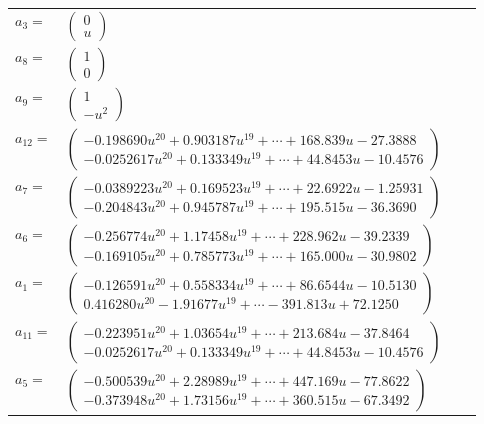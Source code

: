\documentclass[1p]{elsarticle_modified}
\theoremstyle{definition}
\begin{document}
\begin{tabular}{m{7pt} m{180pt} m{7pt} m{180pt} }
\flushright $a_{3}=$&$\begin{pmatrix}0\\u\end{pmatrix}$ \\
\flushright $a_{8}=$&$\begin{pmatrix}1\\0\end{pmatrix}$ \\
\flushright $a_{9}=$&$\begin{pmatrix}1\\- u^2\end{pmatrix}$ \\
\flushright $a_{12}=$&$\begin{pmatrix}-0.198690 u^{20}+0.903187 u^{19}+\cdots+168.839 u-27.3888\\-0.0252617 u^{20}+0.133349 u^{19}+\cdots+44.8453 u-10.4576\end{pmatrix}$ \\
\flushright $a_{7}=$&$\begin{pmatrix}-0.0389223 u^{20}+0.169523 u^{19}+\cdots+22.6922 u-1.25931\\-0.204843 u^{20}+0.945787 u^{19}+\cdots+195.515 u-36.3690\end{pmatrix}$ \\
\flushright $a_{6}=$&$\begin{pmatrix}-0.256774 u^{20}+1.17458 u^{19}+\cdots+228.962 u-39.2339\\-0.169105 u^{20}+0.785773 u^{19}+\cdots+165.000 u-30.9802\end{pmatrix}$ \\
\flushright $a_{1}=$&$\begin{pmatrix}-0.126591 u^{20}+0.558334 u^{19}+\cdots+86.6544 u-10.5130\\0.416280 u^{20}-1.91677 u^{19}+\cdots-391.813 u+72.1250\end{pmatrix}$ \\
\flushright $a_{11}=$&$\begin{pmatrix}-0.223951 u^{20}+1.03654 u^{19}+\cdots+213.684 u-37.8464\\-0.0252617 u^{20}+0.133349 u^{19}+\cdots+44.8453 u-10.4576\end{pmatrix}$ \\
\flushright $a_{5}=$&$\begin{pmatrix}-0.500539 u^{20}+2.28989 u^{19}+\cdots+447.169 u-77.8622\\-0.373948 u^{20}+1.73156 u^{19}+\cdots+360.515 u-67.3492\end{pmatrix}$ \\

\end{tabular}
\end{document}
